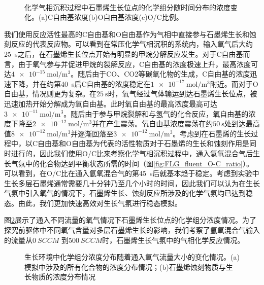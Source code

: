\begin{figure}[htb]
    \centering
    \\[-0.5ex]
    \caption{化学气相沉积过程中石墨烯生长位点的化学组分随时间分布的浓度变化。(a)C自由基浓度(b)O自由基浓度(c)O/C比例。
    }
    \label{fig:FLG_fluent}
\end{figure}

我们使用反应活性最高的C自由基和O自由基作为气相中直接参与石墨烯生长和蚀刻反应的代表反应物。可以看到在常压化学气相沉积的系统内，输入氧气后大约\SI{25}{\second}之后，在石墨烯生长位点开始有明显的甲烷分解反应发生。对于C自由基而言，由于氧气参与并促进甲烷的裂解反应，C自由基的浓度极速上升，最高浓度可达$\SI{4e-15}{\mole\per\cubic\metre}$。随后由于CO、CO2等碳氧化物的生成，C自由基的浓度迅速下降，并在约第\SI{40}{\second}后C自由基的浓度稳定在$\SI{1e-17}{\mole\per\cubic\metre}$附近。而对于O自由基，情况则更为复杂。在$\SI{25}{\second}$时，氧气经过气体输运到达石墨烯生长位点，被迅速加热开始分解成为氧自由基。此时氧自由基的最高浓度最高可达$\SI{3e-11}{\mole\per\cubic\metre}$。随后由于参与甲烷裂解和与氢气的化合反应，氧自由基的浓度下降至$\SI{2e-12}{\mole\per\cubic\metre}$并在产生震荡。氧自由基浓度震荡在约$\SI{50}{\second}$处到达最高值$\SI{8e-12}{\mole\per\cubic\metre}$并逐渐回落至$\SI{3e-12}{\mole\per\cubic\metre}$。考虑到在石墨烯的生长过程中，以C自由基和O自由基为代表的活性物质对于石墨烯的生长和蚀刻作用是同时进行的，因此我们使用O/C比来考察化学气相沉积过程中，通入氩氧混合气后生长气氛中的化合物达到平衡状态所需的时间（图\ref{fig:FLG_fluent_O-C_ratio}）。可以看到，在O/C比在通入氩氧混合气的第\SI{45}{\second}后就基本趋于稳定。考虑到实验中生长多层石墨烯通常需要几十分钟乃至几个小时的时间，因此我们可以认为在生长气氛中引入氧气的情况下，石墨烯生长、蚀刻反应所涉及的化学气氛均已达到稳态。由此，我们更加快速高效对生长气氛进行稳态模拟。

图\ref{fig:FLG_chemkin}展示了通入不同流量的氧气情况下石墨烯生长位点的化学组分浓度情况。为了探究前驱体中不同氧气含量对多层石墨烯生长的影响，我们考察了氩氧混合气输入的流量从$\SI{0}{SCCM}$ 到$\SI{500}{SCCM}$时，石墨烯生长气氛中的气相化学反应情况。

\begin{figure}[htb]
    \caption{生长环境中化学组分浓度分布随着通入氧气流量大小的变化情况。(a)模拟中涉及的所有化合物的浓度分布情况；(b)石墨烯蚀刻物质与生长物质的浓度分布情况}
    \label{fig:FLG_chemkin}
\end{figure}


